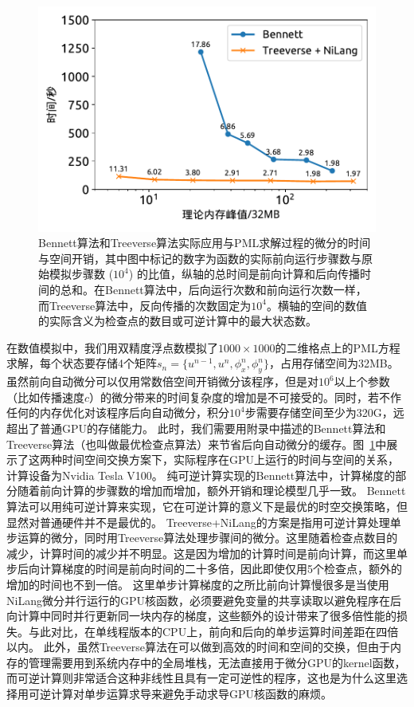 \documentclass[A4,twoside,UTF8]{ctexart}
\begin{document}
\begin{figure}[t]
\centering
\includegraphics[width=0.6\columnwidth]{./fig5.pdf}
    \caption{Bennett算法和Treeverse算法实际应用与PML求解过程的微分的时间与空间开销，其中图中标记的数字为函数的实际前向运行步骤数与原始模拟步骤数 ($10^4$) 的比值，纵轴的总时间是前向计算和后向传播时间的总和。在Bennett算法中，后向运行次数和前向运行次数一样，而Treeverse算法中，反向传播的次数固定为$10^4$。横轴的空间的数值的实际含义为检查点的数目或可逆计算中的最大状态数。\label{fig:seismic}}
\end{figure}

在数值模拟中，我们用双精度浮点数模拟了$1000 \times 1000$的二维格点上的PML方程求解，每个状态要存储4个矩阵$s_n = \{u^{n-1}, u^n, \phi_x^n, \phi_y^n\}$，占用存储空间为32MB。
虽然前向自动微分可以仅用常数倍空间开销微分该程序，但是对$10^6$以上个参数（比如传播速度$c$）的微分带来的时间复杂度的增加是不可接受的。同时，若不作任何的内存优化对该程序后向自动微分，积分$10^4$步需要存储空间至少为320G，远超出了普通GPU的存储能力。
此时，我们需要用附录中描述的Bennett算法和Treeverse算法（也叫做最优检查点算法）来节省后向自动微分的缓存。图~\ref{fig:seismic}中展示了这两种时间空间交换方案下，实际程序在GPU上运行的时间与空间的关系，计算设备为Nvidia Tesla V100。
纯可逆计算实现的Bennett算法中，计算梯度的部分随着前向计算的步骤数的增加而增加，额外开销和理论模型几乎一致。
Bennett算法可以用纯可逆计算来实现，它在可逆计算的意义下是最优的时空交换策略，但显然对普通硬件并不是最优的。
Treeverse+NiLang的方案是指用可逆计算处理单步运算的微分，同时用Treeverse算法处理步骤间的微分。这里随着检查点数目的减少，计算时间的减少并不明显。这是因为增加的计算时间是前向计算，而这里单步后向计算梯度的时间是前向时间的二十多倍，因此即使仅用5个检查点，额外的增加的时间也不到一倍。
这里单步计算梯度的之所比前向计算慢很多是当使用NiLang微分并行运行的GPU核函数，必须要避免变量的共享读取以避免程序在后向计算中同时并行更新同一块内存的梯度，这些额外的设计带来了很多倍性能的损失。与此对比，在单线程版本的CPU上，前向和后向的单步运算时间差距在四倍以内。
此外，虽然Treeverse算法在可以做到高效的时间和空间的交换，但由于内存的管理需要用到系统内存中的全局堆栈，无法直接用于微分GPU的kernel函数，而可逆计算则非常适合这种非线性且具有一定可逆性的程序，这也是为什么这里选择用可逆计算对单步运算求导来避免手动求导GPU核函数的麻烦。
\end{document}
